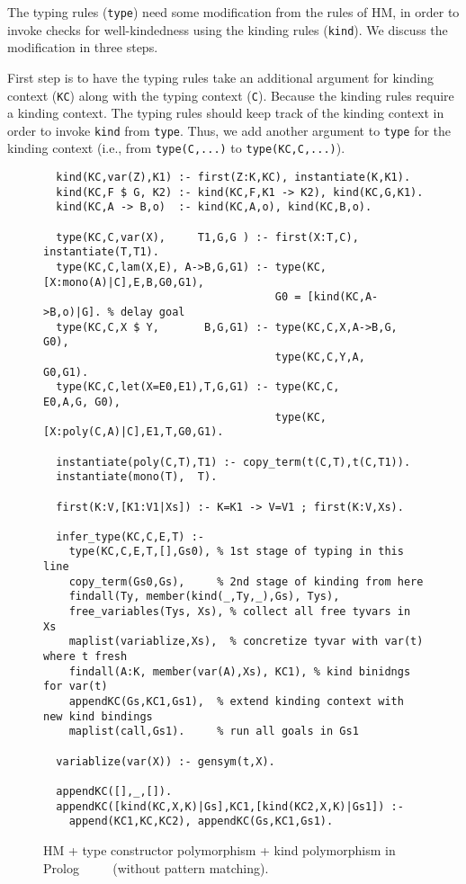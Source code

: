 \documentclass[runningheads,a4paper]{llncs}
\begin{document}
The typing rules (\verb|type|) need some modification from the rules of HM,
in order to invoke checks for well-kindedness using the kinding rules
(\verb|kind|). We discuss the modification in three steps.

First step is to have the typing rules take an additional argument for
kinding context (\verb|KC|) along with the typing context (\verb|C|).
Because the kinding rules require a kinding context. The typing rules
should keep track of the kinding context in order to invoke \verb|kind|
from \verb|type|. Thus, we add another argument to \verb|type| for
the kinding context (i.e., from \verb|type(C,...)| to \verb|type(KC,C,...)|).

\begin{figure}
\begin{verbatim}
  kind(KC,var(Z),K1) :- first(Z:K,KC), instantiate(K,K1).
  kind(KC,F $ G, K2) :- kind(KC,F,K1 -> K2), kind(KC,G,K1).
  kind(KC,A -> B,o)  :- kind(KC,A,o), kind(KC,B,o).
  
  type(KC,C,var(X),     T1,G,G ) :- first(X:T,C), instantiate(T,T1).
  type(KC,C,lam(X,E), A->B,G,G1) :- type(KC,[X:mono(A)|C],E,B,G0,G1),
                                    G0 = [kind(KC,A->B,o)|G]. % delay goal
  type(KC,C,X $ Y,       B,G,G1) :- type(KC,C,X,A->B,G, G0),
                                    type(KC,C,Y,A,   G0,G1).
  type(KC,C,let(X=E0,E1),T,G,G1) :- type(KC,C,              E0,A,G, G0),
                                    type(KC,[X:poly(C,A)|C],E1,T,G0,G1).
  
  instantiate(poly(C,T),T1) :- copy_term(t(C,T),t(C,T1)).
  instantiate(mono(T),  T).
  
  first(K:V,[K1:V1|Xs]) :- K=K1 -> V=V1 ; first(K:V,Xs).
  
  infer_type(KC,C,E,T) :-
    type(KC,C,E,T,[],Gs0), % 1st stage of typing in this line
    copy_term(Gs0,Gs),     % 2nd stage of kinding from here
    findall(Ty, member(kind(_,Ty,_),Gs), Tys),
    free_variables(Tys, Xs), % collect all free tyvars in Xs
    maplist(variablize,Xs),  % concretize tyvar with var(t) where t fresh
    findall(A:K, member(var(A),Xs), KC1), % kind binidngs for var(t)
    appendKC(Gs,KC1,Gs1),  % extend kinding context with new kind bindings
    maplist(call,Gs1).     % run all goals in Gs1
  
  variablize(var(X)) :- gensym(t,X).

  appendKC([],_,[]).
  appendKC([kind(KC,X,K)|Gs],KC1,[kind(KC2,X,K)|Gs1]) :-
    append(KC1,KC,KC2), appendKC(Gs,KC1,Gs1).
\end{verbatim}
\caption{HM + type constructor polymorphism + kind polymorphism in Prolog
        $\qquad$
        (without pattern matching).}
\label{fig:HMtck}
\end{figure}
\end{document}
